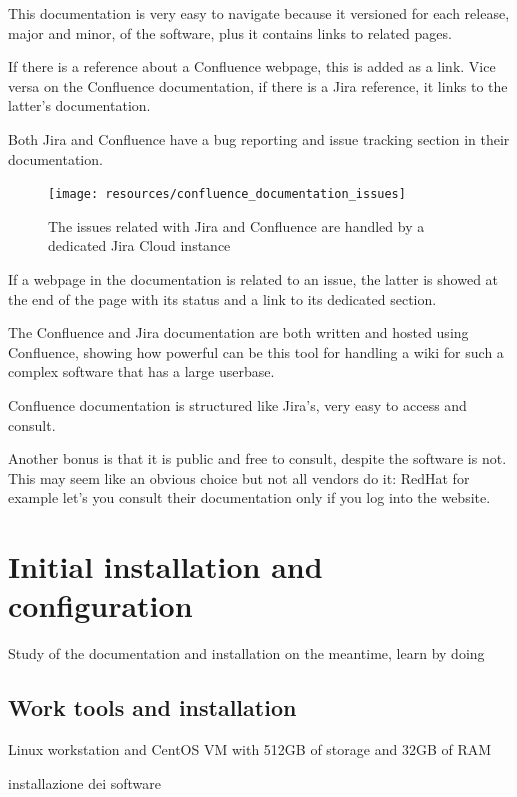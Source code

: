 	This documentation is very easy to navigate because it versioned for each release, major and minor, of the software, plus it contains links to related pages.
	
	If there is a reference about a Confluence webpage, this is added as a link.
	Vice versa on the Confluence documentation, if there is a Jira reference, it links to the latter's documentation.
	
	Both Jira and Confluence have a bug reporting and issue tracking section in their documentation.
	\begin{figure}[H]
		\centering
		\texttt{[image: resources/confluence\_documentation\_issues]}\\
		\caption{The issues related with Jira and Confluence are handled by a dedicated Jira Cloud instance}
	\end{figure}
	
	If a webpage in the documentation is related to an issue, the latter is showed at the end of the page with its status and a link to its dedicated section.
	
	The Confluence and Jira documentation are both written and hosted using Confluence, showing how powerful can be this tool for handling a wiki for such a complex software that has a large userbase.
	
	Confluence documentation is structured like Jira's, very easy to access and consult.
	
	Another bonus is that it is public and free to consult, despite the software is not.
	This may seem like an obvious choice but not all vendors do it: RedHat for example let's you consult their documentation only if you log into the website.
	
\section{Initial installation and configuration}
	
	Study of the documentation and installation on the meantime, learn by doing
	
	\subsection{Work tools and installation}
		
		Linux workstation and CentOS VM with 512GB of storage and 32GB of RAM
	
		installazione dei software\\
		
